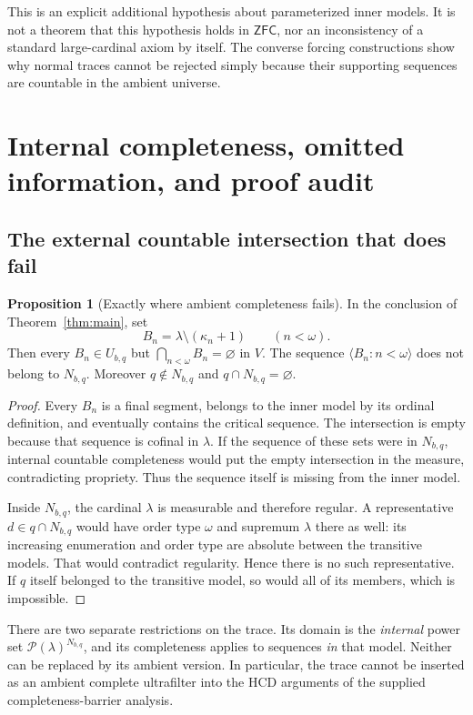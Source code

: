 \documentclass[11pt,letterpaper]{article}
\theoremstyle{definition}
\newtheorem{proposition}[definition]{Proposition}
\numberwithin{equation}{section}
\newcommand{\ZFC}{\mathsf{ZFC}}
\newcommand{\Pow}{\mathcal P}
\newcommand{\seq}[1]{\langle #1\rangle}
\begin{document}
This is an explicit additional hypothesis about parameterized inner
models. It is not a theorem that this hypothesis holds in $\ZFC$, nor
an inconsistency of a standard large-cardinal axiom by itself. The
converse forcing constructions show why normal traces cannot be
rejected simply because their supporting sequences are countable in
the ambient universe.

\section{Internal completeness, omitted information, and proof audit}\label{sec:audit}

\subsection{The external countable intersection that does fail}

\begin{proposition}[Exactly where ambient completeness fails]\label{prop:external}
In the conclusion of Theorem~\ref{thm:main}, set
\[
 B_n=\lambda\setminus(\kappa_n+1)\qquad(n<\omega).
\]
Then every $B_n\in U_{b,q}$ but $\bigcap_{n<\omega}B_n=\varnothing$ in
$V$. The sequence $\seq{B_n:n<\omega}$ does not belong to $N_{b,q}$.
Moreover $q\notin N_{b,q}$ and $q\cap N_{b,q}=\varnothing$.
\end{proposition}

\begin{proof}
Every $B_n$ is a final segment, belongs to the inner model by its
ordinal definition, and eventually contains the critical sequence.
The intersection is empty because that sequence is cofinal in
$\lambda$. If the sequence of these sets were in $N_{b,q}$, internal
countable completeness would put the empty intersection in the
measure, contradicting propriety. Thus the sequence itself is missing
from the inner model.

Inside $N_{b,q}$, the cardinal $\lambda$ is measurable and therefore
regular. A representative $d\in q\cap N_{b,q}$ would have order type
$\omega$ and supremum $\lambda$ there as well: its increasing
enumeration and order type are absolute between the transitive models.
That would contradict regularity. Hence there is no such
representative. If $q$ itself belonged to the transitive model, so
would all of its members, which is impossible.
\end{proof}

There are two separate restrictions on the trace. Its domain is the
\emph{internal} power set $\Pow(\lambda)^{N_{b,q}}$, and its
completeness applies to sequences \emph{in} that model. Neither can
be replaced by its ambient version. In particular, the trace cannot
be inserted as an ambient complete ultrafilter into the HCD arguments
of the supplied completeness-barrier analysis.
\end{document}
